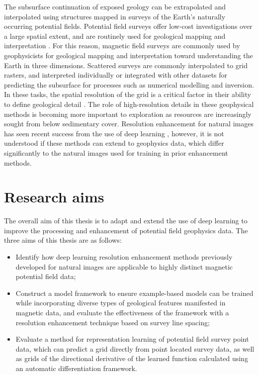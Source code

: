 % 
% 

The subsurface continuation of exposed geology can be extrapolated and interpolated using structures mapped in surveys of the Earth's naturally occurring potential fields.
Potential field surveys offer low-cost investigations over a large spatial extent, and are routinely used for geological mapping and interpretation \parencite{nabighian75thAnniversaryHistorical2005}.
For this reason, magnetic field surveys are commonly used by geophysicists for geological mapping and interpretation toward understanding the Earth in three dimensions.
Scattered surveys are commonly interpolated to grid rasters, and interpreted individually or integrated with other datasets for predicting the subsurface for processes such as numerical modelling and inversion.
In these tasks, the spatial resolution of the grid is a critical factor in their ability to define geological detail \parencite{islesGeologicalInterpretationAeromagnetic2013}.
The role of high-resolution details in these geophysical methods is becoming more important to exploration as resources are increasingly sought from below sedimentary cover.
Resolution enhancement for natural images has seen recent success from the use of deep learning \parencite{moserHitchhikerGuideSuperResolution2023}, however, it is not understood if these methods can extend to geophysics data, which differ significantly to the natural images used for training in prior enhancement methods.

\section{Research aims}
The overall aim of this thesis is to adapt and extend the use of deep learning to improve the processing and enhancement of potential field geophysics data. The three aims of this thesis are as follows:

\begin{itemize}
    \item{} Identify how deep learning resolution enhancement methods previously developed for natural images are applicable to highly distinct magnetic potential field data;

    \item{} Construct a model framework to ensure example-based models can be trained while incorporating diverse types of geological features manifested in magnetic data, and evaluate the effectiveness of the framework with a resolution enhancement technique based on survey line spacing;

    \item{} Evaluate a method for representation learning of potential field survey point data, which can predict a grid directly from point located survey data, as well as grids of the directional derivative of the learned function calculated using an automatic differentiation framework.
\end{itemize}

